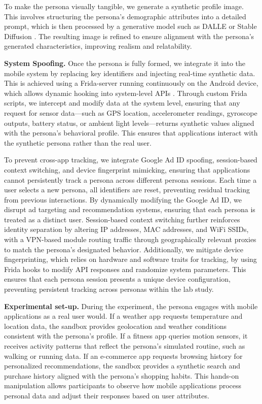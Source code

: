 \documentclass[acmlarge, nonacm]{acmart}
\begin{document}
To make the persona visually tangible, we generate a synthetic profile image. This involves structuring the persona’s demographic attributes into a detailed prompt, which is then processed by a generative model such as DALLE \cite{dalle} or Stable Diffusion \cite{stablediffusion}. The resulting image is refined to ensure alignment with the persona’s generated characteristics, improving realism and relatability.

\textbf{System Spoofing.} Once the persona is fully formed, we integrate it into the mobile system by replacing key identifiers and injecting real-time synthetic data. This is achieved using a Frida-server running continuously on the Android device, which allows dynamic hooking into system-level APIs \cite{frida}. Through custom Frida scripts, we intercept and modify data at the system level, ensuring that any request for sensor data—such as GPS location, accelerometer readings, gyroscope outputs, battery status, or ambient light levels—returns synthetic values aligned with the persona's behavioral profile. This ensures that applications interact with the synthetic persona rather than the real user.

To prevent cross-app tracking, we integrate Google Ad ID spoofing, session-based context switching, and device fingerprint mimicking, ensuring that applications cannot persistently track a persona across different persona sessions. Each time a user selects a new persona, all identifiers are reset, preventing residual tracking from previous interactions. By dynamically modifying the Google Ad ID, we disrupt ad targeting and recommendation systems, ensuring that each persona is treated as a distinct user. Session-based context switching further reinforces identity separation by altering IP addresses, MAC addresses, and WiFi SSIDs, with a VPN-based module routing traffic through geographically relevant proxies to match the persona’s designated behavior. Additionally, we mitigate device fingerprinting, which relies on hardware and software traits for tracking, by using Frida hooks to modify API responses and randomize system parameters. This ensures that each persona session presents a unique device configuration, preventing persistent tracking across personas within the lab study.

\textbf{Experimental set-up.} During the experiment, the persona engages with mobile applications as a real user would. If a weather app requests temperature and location data, the sandbox provides geolocation and weather conditions consistent with the persona’s profile. If a fitness app queries motion sensors, it receives activity patterns that reflect the persona’s simulated routine, such as walking or running data. If an e-commerce app requests browsing history for personalized recommendations, the sandbox provides a synthetic search and purchase history aligned with the persona’s shopping habits. This hands-on manipulation allows participants to observe how mobile applications process personal data and adjust their responses based on user attributes.
\end{document}
